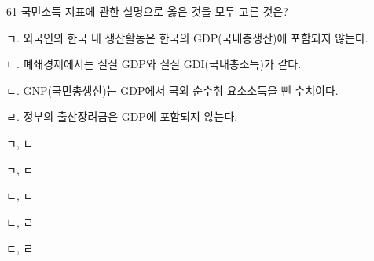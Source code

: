 \begin{question}{61}
국민소득 지표에 관한 설명으로 옳은 것을 모두 고른 것은?
\begin{framedtext}
ㄱ. 외국인의 한국 내 생산활동은 한국의 GDP(국내총생산)에 포함되지 않는다. \par
ㄴ. 폐쇄경제에서는 실질 GDP와 실질 GDI(국내총소득)가 같다. \par
ㄷ. GNP(국민총생산)는 GDP에서 국외 순수취 요소소득을 뺀 수치이다. \par
ㄹ. 정부의 출산장려금은 GDP에 포함되지 않는다. \par
\end{framedtext}
\begin{choices}
  \item ㄱ, ㄴ
  \item ㄱ, ㄷ
  \item ㄴ, ㄷ
  \item ㄴ, ㄹ
  \item ㄷ, ㄹ
\end{choices}
\end{question}
